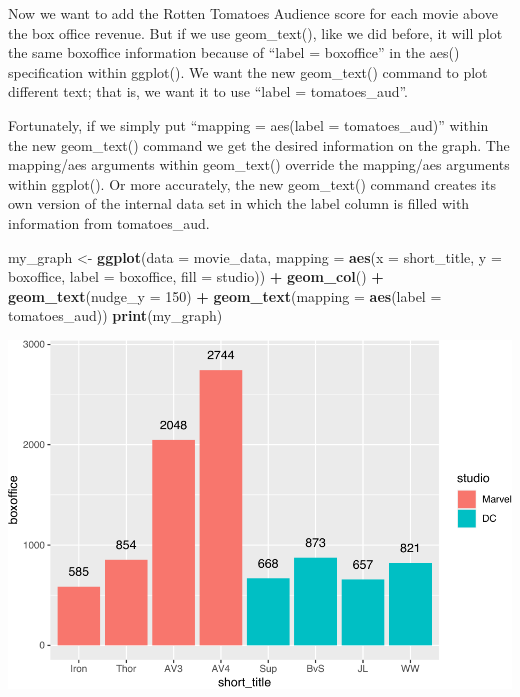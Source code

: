 \documentclass[
]{krantz}
\makeatletter
\newenvironment{Shaded}{\begin{snugshade}}{\end{snugshade}}
\newcommand{\DataTypeTok}[1]{\textcolor[rgb]{0.27,0.27,0.27}{#1}}
\newcommand{\DecValTok}[1]{\textcolor[rgb]{0.06,0.06,0.06}{#1}}
\newcommand{\KeywordTok}[1]{\textcolor[rgb]{0.27,0.27,0.27}{\textbf{#1}}}
\newcommand{\NormalTok}[1]{#1}
\newcommand{\OperatorTok}[1]{\textcolor[rgb]{0.43,0.43,0.43}{\textbf{#1}}}
\newcommand{\StringTok}[1]{\textcolor[rgb]{0.5,0.5,0.5}{#1}}
\newenvironment{kframe}{%
\medskip{}
\setlength{\fboxsep}{.8em}
 \def\at@end@of@kframe{}%
 \ifinner\ifhmode%
  \def\at@end@of@kframe{\end{minipage}}%
  \begin{minipage}{\columnwidth}%
 \fi\fi%
 \def\FrameCommand##1{\hskip\@totalleftmargin \hskip-\fboxsep
 \colorbox{shadecolor}{##1}\hskip-\fboxsep
     \hskip-\linewidth \hskip-\@totalleftmargin \hskip\columnwidth}%
 \MakeFramed {\advance\hsize-\width
   \@totalleftmargin\z@ \linewidth\hsize
   \@setminipage}}%
 {\par\unskip\endMakeFramed%
 \at@end@of@kframe}
\renewenvironment{Shaded}{\begin{kframe}}{\end{kframe}}
\makeatother
\begin{document}
Now we want to add the Rotten Tomatoes Audience score for each movie above the box office revenue. But if we use geom\_text(), like we did before, it will plot the same boxoffice information because of ``label = boxoffice'' in the aes() specification within ggplot(). We want the new geom\_text() command to plot different text; that is, we want it to use ``label = tomatoes\_aud''.

Fortunately, if we simply put ``mapping = aes(label = tomatoes\_aud)'' within the new geom\_text() command we get the desired information on the graph. The mapping/aes arguments within geom\_text() override the mapping/aes arguments within ggplot(). Or more accurately, the new geom\_text() command creates its own version of the internal data set in which the label column is filled with information from tomatoes\_aud.

\begin{Shaded}
\begin{Highlighting}[]
\NormalTok{my_graph <-}\StringTok{ }\KeywordTok{ggplot}\NormalTok{(}\DataTypeTok{data =}\NormalTok{ movie_data,}
           \DataTypeTok{mapping =} \KeywordTok{aes}\NormalTok{(}\DataTypeTok{x =}\NormalTok{ short_title,}
                         \DataTypeTok{y =}\NormalTok{ boxoffice,}
                         \DataTypeTok{label =}\NormalTok{ boxoffice, }
                         \DataTypeTok{fill =}\NormalTok{ studio)) }\OperatorTok{+}
\StringTok{  }\KeywordTok{geom_col}\NormalTok{() }\OperatorTok{+}
\StringTok{  }\KeywordTok{geom_text}\NormalTok{(}\DataTypeTok{nudge_y =} \DecValTok{150}\NormalTok{)  }\OperatorTok{+}
\StringTok{  }\KeywordTok{geom_text}\NormalTok{(}\DataTypeTok{mapping =} \KeywordTok{aes}\NormalTok{(}\DataTypeTok{label =}\NormalTok{ tomatoes_aud)) }
\KeywordTok{print}\NormalTok{(my_graph)}
\end{Highlighting}
\end{Shaded}

\includegraphics{bookdown_files/figure-latex/unnamed-chunk-244-1.pdf}
\end{document}
